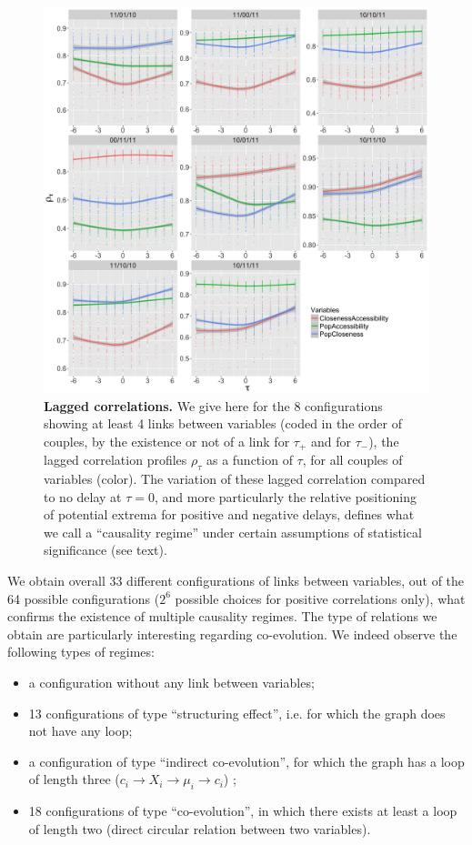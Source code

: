 \documentclass[11pt]{article}
\begin{document}
\begin{figure}
	\includegraphics[width=\linewidth]{figures/Fig4.jpg}
\caption{\textbf{Lagged correlations.} We give here for the 8 configurations showing at least 4 links between variables (coded in the order of couples, by the existence or not of a link for $\tau_+$ and for $\tau_-$), the lagged correlation profiles $\rho_{\tau}$ as a function of $\tau$, for all couples of variables (color). The variation of these lagged correlation compared to no delay at $\tau=0$, and more particularly the relative positioning of potential extrema for positive and negative delays, defines what we call a ``causality regime'' under certain assumptions of statistical significance (see text).\label{fig:macrocoevol:correlations}}
\end{figure}


We obtain overall 33 different configurations of links between variables, out of the 64 possible configurations ($2^6$ possible choices for positive correlations only), what confirms the existence of multiple causality regimes. The type of relations we obtain are particularly interesting regarding co-evolution. We indeed observe the following types of regimes:
\begin{itemize}
\item a configuration without any link between variables;
\item 13 configurations of type ``structuring effect'', i.e. for which the graph does not have any loop;
\item a configuration of type ``indirect co-evolution'', for which the graph has a loop of length three ($c_i \rightarrow X_i \rightarrow \mu_i \rightarrow c_i$) ;
\item 18 configurations of type ``co-evolution'', in which there exists at least a loop of length two (direct circular relation between two variables).
\end{itemize}
\end{document}
